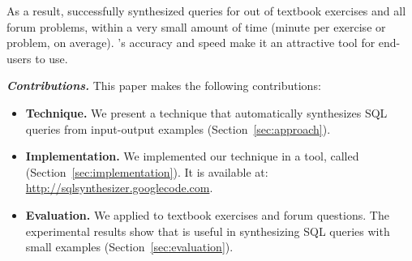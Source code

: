 As a result, \ourtool successfully synthesized queries
for \solexnum out of \exnum textbook exercises and
all \pnum forum problems, within a very
small amount of time (\avgtime minute per exercise or problem, on average).
\ourtool's accuracy and speed make it an attractive
tool for end-users to use.%


\vspace{1mm}
\noindent\textbf{\textit{Contributions.}}
This paper makes the following contributions:

\begin{itemize}

\item \textbf{Technique.} We present a technique that automatically
synthesizes SQL queries from input-output examples
(Section~\ref{sec:approach}).

\item \textbf{Implementation.} We implemented our technique in a
tool, called \ourtool (Section~\ref{sec:implementation}). It is
available at: \url{http://sqlsynthesizer.googlecode.com}.

\item \textbf{Evaluation.} We applied \ourtool
to \exnum textbook exercises and \pnum 
forum questions.
The experimental results show that \ourtool is
useful in synthesizing SQL queries with
small examples (Section~\ref{sec:evaluation}).
\end{itemize}
